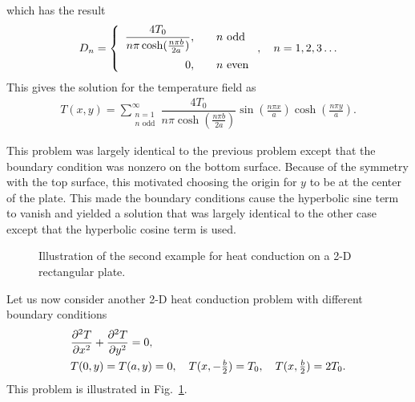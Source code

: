 which has the result
\begin{align}
  D_n  = \left\{ \begin{array}{r l}
  \dfrac{4 T_0}{n\pi \cosh ( \frac{n\pi b}{2 a} )}, & \quad n \text{ odd} \vspace{0.2cm} \\
  0, & \quad n \text{ even} \\ \end{array} \right. ,  \quad n = 1, 2, 3 \ldots 
\end{align}
This gives the solution for the temperature field as
\begin{align}
  T(x,y) = \sum_{\substack{n=1 \\ n \text{ odd}}}^\infty  \dfrac{4 T_0}{n\pi \cosh ( \frac{n\pi b}{2 a} ) } \sin \left( \frac{n\pi x}{a} \right) \cosh \left( \frac{n\pi y}{a} \right) .
\end{align}

This problem was largely identical to the previous problem except that the boundary condition was nonzero on the bottom surface. Because of the symmetry with the top surface, this motivated choosing the origin for $y$ to be at the center of the plate. This made the boundary conditions cause the hyperbolic sine term to vanish and yielded a solution that was largely identical to the other case except that the hyperbolic cosine term is used.

\begin{figure}[tb!]
\begin{center}
\caption{Illustration of the second example for heat conduction on a 2-D rectangular plate.}
\label{Fig:pde_illustration2DRectangularPlate2}
\end{center}
\end{figure}

Let us now consider another 2-D heat conduction problem with different boundary conditions
\begin{align}
  &\frac{ \partial^2 {T} }{ \partial {x}^2 } + \frac{ \partial^2 {T} }{ \partial {y}^2 } = 0 , \nonumber \\ &T(0,y) = T(a,y) = 0, \quad T(x,-\tfrac{b}{2}) = T_0, \quad T(x,\tfrac{b}{2}) = 2 T_0.
\end{align}
This problem is illustrated in Fig.~\ref{Fig:pde_illustration2DRectangularPlate2}.

